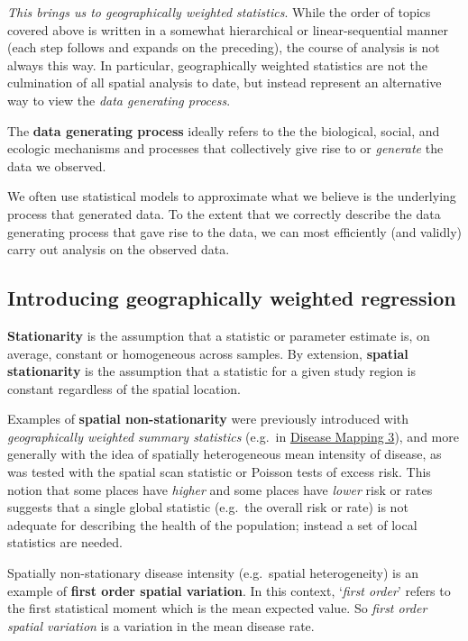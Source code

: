 \documentclass[
]{book}
\newenvironment{rmdnote}[1]
  {
  \begin{itemize}
  \renewcommand{\labelitemi}{
    \raisebox{-.7\height}[0pt][0pt]{
      {\setkeys{Gin}{width=3em,keepaspectratio}\texttt{[image: images/\#1]}}
    }
  }
  \setlength{\fboxsep}{1em}
  \begin{note}
  \item
  }
  {
  \end{note}
  \end{itemize}
  }
\begin{document}
\emph{This brings us to geographically weighted statistics}. While the order of topics covered above is written in a somewhat hierarchical or linear-sequential manner (each step follows and expands on the preceding), the course of analysis is not always this way. In particular, geographically weighted statistics are not the culmination of all spatial analysis to date, but instead represent an alternative way to view the \emph{data generating process}.

\begin{rmdnote}{note}
The \textbf{data generating process} ideally refers to the the biological, social, and ecologic mechanisms and processes that collectively give rise to or \emph{generate} the data we observed.

We often use statistical models to approximate what we believe is the underlying process that generated data. To the extent that we correctly describe the data generating process that gave rise to the data, we can most efficiently (and validly) carry out analysis on the observed data.

\end{rmdnote}

\hypertarget{introducing-geographically-weighted-regression}{%
\subsection{Introducing geographically weighted regression}\label{introducing-geographically-weighted-regression}}

\textbf{Stationarity} is the assumption that a statistic or parameter estimate is, on average, constant or homogeneous across samples. By extension, \textbf{spatial stationarity} is the assumption that a statistic for a given study region is constant regardless of the spatial location.

Examples of \textbf{spatial non-stationarity} were previously introduced with \emph{geographically weighted summary statistics} (e.g.~in \protect\hyperlink{gwss}{Disease Mapping 3}), and more generally with the idea of spatially heterogeneous mean intensity of disease, as was tested with the spatial scan statistic or Poisson tests of excess risk. This notion that some places have \emph{higher} and some places have \emph{lower} risk or rates suggests that a single global statistic (e.g.~the overall risk or rate) is not adequate for describing the health of the population; instead a set of local statistics are needed.

Spatially non-stationary disease intensity (e.g.~spatial heterogeneity) is an example of \textbf{first order spatial variation}. In this context, `\emph{first order}' refers to the first statistical moment which is the mean expected value. So \emph{first order spatial variation} is a variation in the mean disease rate.
\end{document}
